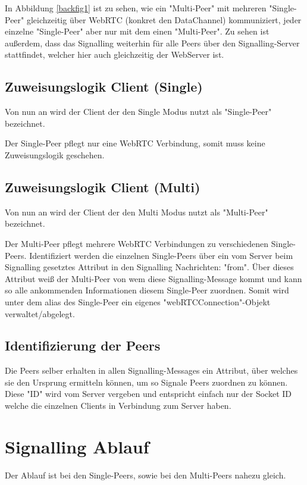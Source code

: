 In Abbildung \ref{backfig1} ist zu sehen, wie ein "Multi-Peer" mit mehreren "Single-Peer" gleichzeitig über WebRTC (konkret den DataChannel) kommuniziert, jeder einzelne "Single-Peer" aber nur mit dem einen "Multi-Peer". Zu sehen ist außerdem, dass das Signalling weiterhin für alle Peers über den Signalling-Server stattfindet, welcher hier auch gleichzeitig der WebServer ist.

\subsection{Zuweisungslogik Client (Single)}
Von nun an wird der Client der den Single Modus nutzt als "Single-Peer" bezeichnet.


Der Single-Peer pflegt nur eine WebRTC Verbindung, somit muss keine Zuweisungslogik geschehen.

\subsection{Zuweisungslogik Client (Multi)}
Von nun an wird der Client der den Multi Modus nutzt als "Multi-Peer" bezeichnet.


Der Multi-Peer pflegt mehrere WebRTC Verbindungen zu verschiedenen Single-Peers. Identifiziert werden die einzelnen Single-Peers über ein vom Server beim Signalling gesetztes Attribut in den Signalling Nachrichten: "from". Über dieses Attribut weiß der Multi-Peer von wem diese Signalling-Message kommt und kann so alle ankommenden Informationen diesem Single-Peer zuordnen. Somit wird unter dem alias des Single-Peer ein eigenes "webRTCConnection"-Objekt verwaltet/abgelegt.

\subsection{Identifizierung der Peers}
Die Peers selber erhalten in allen Signalling-Messages ein Attribut, über welches sie den Ursprung ermitteln können, um so Signale Peers zuordnen zu können. Diese "ID" wird vom Server vergeben und entspricht einfach nur der Socket ID welche die einzelnen Clients in Verbindung zum Server haben.

\section{Signalling Ablauf}
Der Ablauf ist bei den Single-Peers, sowie bei den Multi-Peers nahezu gleich.

